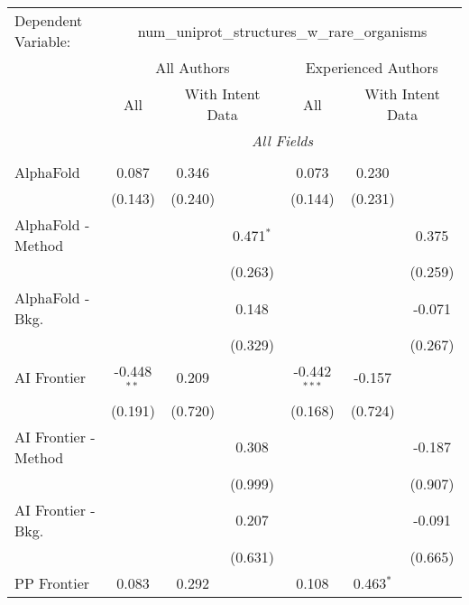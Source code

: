 \begingroup
\centering
\begin{tabular}{lcccccc}
   \tabularnewline \midrule \midrule
   Dependent Variable: & \multicolumn{6}{c}{num\_uniprot\_structures\_w\_rare\_organisms}\\
 & \multicolumn{3}{c}{All Authors} & \multicolumn{3}{c}{Experienced Authors} \\
\cmidrule(lr){2-4} \cmidrule(lr){5-7}
 & \multicolumn{1}{c}{All} & \multicolumn{2}{c}{With Intent Data} & \multicolumn{1}{c}{All} & \multicolumn{2}{c}{With Intent Data} \\
\cmidrule(lr){2-2} \cmidrule(lr){3-4} \cmidrule(lr){5-5} \cmidrule(lr){6-7}
 & \multicolumn{6}{c}{\textit{All Fields}} \\ \\
   AlphaFold            & 0.087         & 0.346   &              & 0.073          & 0.230       &   \\   
                        & (0.143)       & (0.240) &              & (0.144)        & (0.231)     &   \\   
   AlphaFold - Method   &               &         & 0.471$^{*}$  &                &             & 0.375\\   
                        &               &         & (0.263)      &                &             & (0.259)\\   
   AlphaFold - Bkg.     &               &         & 0.148        &                &             & -0.071\\   
                        &               &         & (0.329)      &                &             & (0.267)\\   
   AI Frontier          & -0.448$^{**}$ & 0.209   &              & -0.442$^{***}$ & -0.157      &   \\   
                        & (0.191)       & (0.720) &              & (0.168)        & (0.724)     &   \\   
   AI Frontier - Method &               &         & 0.308        &                &             & -0.187\\   
                        &               &         & (0.999)      &                &             & (0.907)\\   
   AI Frontier - Bkg.   &               &         & 0.207        &                &             & -0.091\\   
                        &               &         & (0.631)      &                &             & (0.665)\\   
   PP Frontier          & 0.083         & 0.292   &              & 0.108          & 0.463$^{*}$ &   \\   

\end{tabular}
